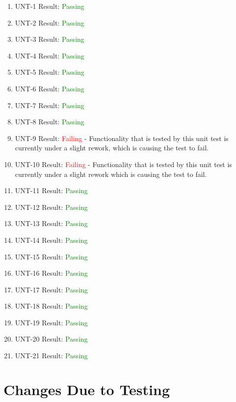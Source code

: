 \documentclass[12pt, titlepage]{article}
\begin{document}
\begin{enumerate}
  \item UNT-1
        Result: \textcolor{green}{Passing}
  \item UNT-2
        Result: \textcolor{green}{Passing}
  \item UNT-3
        Result: \textcolor{green}{Passing}
  \item UNT-4
        Result: \textcolor{green}{Passing}
  \item UNT-5
        Result: \textcolor{green}{Passing}
  \item UNT-6
        Result: \textcolor{green}{Passing}
  \item UNT-7
        Result: \textcolor{green}{Passing}
  \item UNT-8
        Result: \textcolor{green}{Passing}
  \item UNT-9
        Result: \textcolor{red}{Failing} - Functionality that is tested by this unit test is currently under a slight rework, which is causing the test to fail.
  \item UNT-10
        Result: \textcolor{red}{Failing} - Functionality that is tested by this unit test is currently under a slight rework which is causing the test to fail.
  \item UNT-11
        Result: \textcolor{green}{Passing}
  \item UNT-12
        Result: \textcolor{green}{Passing}
  \item UNT-13
        Result: \textcolor{green}{Passing}
  \item UNT-14
        Result: \textcolor{green}{Passing}
  \item UNT-15
        Result: \textcolor{green}{Passing}
  \item UNT-16
        Result: \textcolor{green}{Passing}
  \item UNT-17
        Result: \textcolor{green}{Passing}
  \item UNT-18
        Result: \textcolor{green}{Passing}
  \item UNT-19
        Result: \textcolor{green}{Passing}
  \item UNT-20
        Result: \textcolor{green}{Passing}
  \item UNT-21
        Result: \textcolor{green}{Passing}
\end{enumerate}

\section{Changes Due to Testing}
\end{document}
